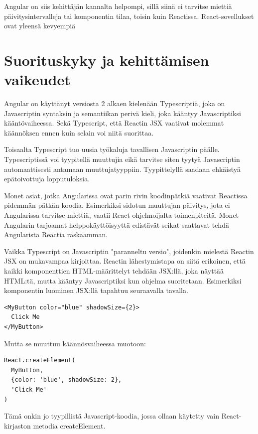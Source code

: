 \documentclass[a4paper,12pt,twoside]{article} %
\begin{document}
{\vspace{4mm}\noindent
Angular on siis kehittäjän kannalta helpompi, sillä siinä ei tarvitse miettiä päivitysintervalleja tai komponentin tilaa, toisin kuin Reactissa. React-sovellukset ovat yleensä kevyempiä 


\newpage

\section{Suorituskyky ja kehittämisen vaikeudet}

Angular on käyttänyt versiosta 2 alkaen kielenään Typescriptiä, joka on Javascriptin syntaksin ja semantiikan perivä kieli, joka kääntyy Javascriptiksi kääntövaiheessa. Sekä Typescript, että Reactin JSX vaativat molemmat käännöksen ennen kuin selain voi niitä suorittaa.\cite{typescript}

\vspace{4mm}\noindent
Toisaalta Typescript tuo uusia työkaluja tavallisen Javascriptin päälle. Typescriptissä voi tyypitellä muuttujia eikä tarvitse siten tyytyä Javascriptin automaattisesti antamaan muuttujatyyppiin. Tyypittelyllä saadaan ehkäistyä epätoivottuja lopputuloksia.

\vspace{4mm}\noindent
Monet asiat, jotka Angularissa ovat parin rivin koodinpätkiä vaativat Reactissa pidemmän pätkän koodia. Esimerkiksi sidotun muuttujan päivitys, jota ei Angularissa tarvitse miettiä, vaatii React-ohjelmoijalta toimenpiteitä. Monet Angularin tarjoamat helppokäyttöisyyttä edistävät seikat saattavat tehdä Angularista Reactia raskaamman.

\vspace{4mm}\noindent
Vaikka Typescript on Javascriptin "paranneltu versio", joidenkin mielestä Reactin JSX on mukavampaa kirjoittaa. Reactin lähestymistapa on siitä erikoinen, että kaikki komponenttien HTML-määrittelyt tehdään JSX:llä, joka näyttää HTML:tä, mutta kääntyy Javascriptiksi kun ohjelma suoritetaan. Esimerkiksi komponentin luominen JSX:llä tapahtuu seuraavalla tavalla.

\vspace{4mm}\noindent
\begin{verbatim}
<MyButton color="blue" shadowSize={2}>
  Click Me
</MyButton>
\end{verbatim}

\vspace{4mm}\noindent
Mutta se muuttuu käännösvaiheessa muotoon:

\vspace{4mm}\noindent
\begin{verbatim}
React.createElement(
  MyButton,
  {color: 'blue', shadowSize: 2},
  'Click Me'
)
\end{verbatim}

\vspace{4mm}\noindent
Tämä onkin jo tyypillistä Javascript-koodia, jossa ollaan käytetty vain React-kirjaston metodia createElement.

}
\newpage
\setcounter{secnumdepth}{0}
\end{document}
